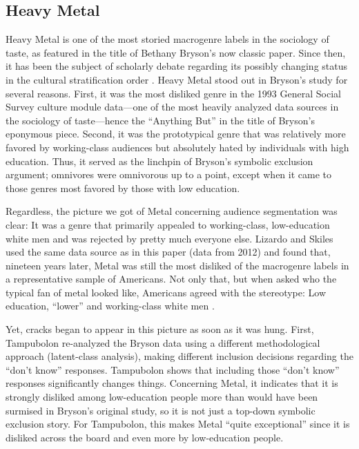 \documentclass[a4paper,12pt]{extarticle}
\begin{document}
\subsection{Heavy Metal}
Heavy Metal is one of the most storied macrogenre labels in the sociology of taste, as featured in the title of Bethany Bryson's \citeyearpar{bryson96} now classic paper. Since then, it has been the subject of scholarly debate regarding its possibly changing status in the cultural stratification order \citep{tampubolon2008revisiting, goldberg2011mapping, lizardo_skiles15}. Heavy Metal stood out in Bryson's study for several reasons. First, it was the most disliked genre in the 1993 General Social Survey culture module data---one of the most heavily analyzed data sources in the sociology of taste---hence the ``Anything But'' in the title of Bryson's eponymous piece. Second, it was the prototypical genre that was relatively more favored by working-class audiences but absolutely hated by individuals with high education. Thus, it served as the linchpin of Bryson's symbolic exclusion argument; omnivores were omnivorous up to a point, except when it came to those genres most favored by those with low education. 

Regardless, the picture we got of Metal concerning audience segmentation was clear: It was a genre that primarily appealed to working-class, low-education white men and was rejected by pretty much everyone else. Lizardo and Skiles \citeyearpar[][6, table 2]{lizardo_skiles16} used the same data source as in this paper (data from 2012) and found that, nineteen years later, Metal was still the most disliked of the macrogenre labels in a representative sample of Americans. Not only that, but when asked who the typical fan of metal looked like, Americans agreed with the stereotype: Low education, ``lower'' and working-class white men \citep[][7, table 3]{lizardo_skiles16}. 

Yet, cracks began to appear in this picture as soon as it was hung. First, Tampubolon \citeyearpar{tampubolon2008revisiting} re-analyzed the Bryson data using a different methodological approach (latent-class analysis), making different inclusion decisions regarding the ``don't know'' responses. Tampubolon shows that including those ``don't know'' responses significantly changes things. Concerning Metal, it indicates that it is strongly disliked among low-education people more than would have been surmised in Bryson's original study, so it is not just a top-down symbolic exclusion story. For Tampubolon, this makes Metal ``quite exceptional'' since it is disliked across the board and even more by low-education people. 
\end{document}
